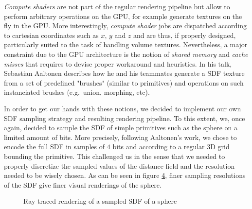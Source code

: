 \documentclass[10pt,a4paper,english, twocolumn]{article}
\begin{document}
\textit{Compute shaders} are not part of the regular rendering pipeline but allow to perform arbitrary operations on the GPU, for example generate textures on the fly in the GPU. More interestingly, \textit{compute shader} jobs are dispatched according to cartesian coordinates such as $x$, $y$ and $z$ and are thus, if properly designed, particularly suited to the task of handling volume textures. Nevertheless, a major constraint due to the GPU architecture is the notion of \textit{shared memory} and \textit{cache misses} that requires to devise proper workaround and heuristics. In his talk, Sebastian Aaltonen describes how he and his teammates generate a SDF texture from a set of predefined "brushes" (similar to primitives) and operations on such instanciated brushes (e.g.\ union, morphing, etc).

In order to get our hands with these notions, we decided to implement our own SDF sampling strategy and resulting rendering pipeline. To this extent, we, once again, decided to sample the SDF of simple primitives such as the sphere on a limited amount of bits. More precisely, following Aaltonen's work, we chose to encode the full SDF in samples of $4$ bits and according to a regular 3D grid bounding the primitive. This challenged us in the sense that we needed to properly discretize the sampled values of the distance field and the resolution needed to be wisely chosen. As can be seen in figure \ref{fig:sampled-sphere}, finer sampling resolutions of the SDF give finer visual renderings of the sphere.

\begin{figure}
    \begin{subfigure}{.33\linewidth}
        \centering
        \caption{}
        \label{sfig:sampled-sphere1}
    \end{subfigure}%
    \begin{subfigure}{.33\linewidth}
        \centering
        \caption{}
        \label{sfig:sampled-sphere2}
    \end{subfigure}
    \begin{subfigure}{.33\linewidth}
        \centering
        \caption{}
        \label{sfig:sampled-sphere3}
    \end{subfigure}
    \caption{Ray traced rendering of a sampled SDF of a sphere}
    \label{fig:sampled-sphere}
\end{figure}
\end{document}
